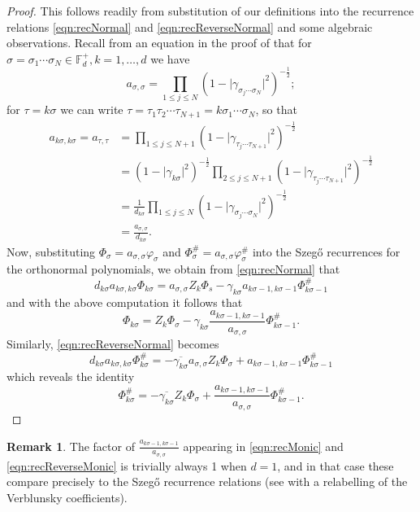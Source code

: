 \documentclass[11pt,reqno]{amsart}
\def\p{\varphi}
\def\g{\gamma}
\def\s{\sigma}
\def\t{\tau}
\def\P{\Phi}
\def\FF{\mathbb{F}}
\theoremstyle{definition}
\newtheorem{remark}[theorem]{Remark}
\numberwithin{equation}{section}
\begin{document}
\begin{proof}
    This follows readily from substitution of our definitions into the recurrence relations \eqref{eqn:recNormal} and \eqref{eqn:recReverseNormal} and some algebraic observations. Recall from an equation in the proof of \cite[Theorem 3.1]{CJ02b} that for \(\s = \s_1\cdots\s_N \in \FF_d^+, k = 1, \ldots, d\) we have
    \[
        a_{\s,\s} = \prod_{1 \leq j \leq N} (1 - \lvert \g_{\s_j \cdots \s_N} \rvert^2)^{-\frac{1}{2}};
    \]
    for \(\t = k\s\) we can write \(\t = \t_1 \t_2 \cdots \t_{N+1} = k \s_1 \cdots \s_N\), so that
    \begin{align*}
        a_{k\s,k\s} = a_{\t,\t} & = \prod_{1 \leq j \leq N+1} (1 - \lvert \g_{\t_j\cdots \t_{N+1}} \rvert^2)^{-\frac{1}{2}}\\
        & = (1 - \lvert \g_{k\s} \rvert^2)^{-\frac{1}{2}} \prod_{2 \leq j \leq N+1} (1 - \lvert \g_{\t_j \cdots \t_{N+1}} \rvert^2)^{-\frac{1}{2}} \\
        & = \frac{1}{d_{k\s}} \prod_{1 \leq j \leq N} (1 - \lvert \g_{\s_j \cdots \s_{N}} \rvert^2)^{-\frac{1}{2}}\\
        & = \frac{a_{\s,\s}}{d_{k\s}}.
    \end{align*}
    Now, substituting \(\P_\s = a_{\s,\s} \p_\s\) and \(\P_\s^{\#} = a_{\s,\s} \p_\s^{\#}\) into the Szeg\H{o} recurrences for the orthonormal polynomials, we obtain from \eqref{eqn:recNormal} that
    \[
        d_{k\s}a_{k\s,k\s} \P_{k\s} = a_{\s,\s} Z_k \P_s - \g_{k\s} a_{k\s-1,k\s-1} \P_{k\s-1}^{\#}
    \]
    and with the above computation it follows that
    \[
        \P_{k\s} = Z_k \P_\s - \g_{k\s}\frac{a_{k\s -1, k\s -1}}{a_{\s,\s}} \P^\#_{k\s - 1}.
    \]
    Similarly, \eqref{eqn:recReverseNormal} becomes
    \[
        d_{k\s} a_{k\s,k\s} \P_{k\s}^{\#} = -\overline{\g_{k\s}} a_{\s,\s} Z_k \P_\s + a_{k\s-1,k\s-1}\P_{k\s-1}^{\#}
    \]
    which reveals the identity
    \[
        \P^\#_{k\s} = -\overline{\g_{k\s}} Z_k \P_\s + \frac{a_{k\s -1, k\s -1}}{a_{\s,\s}}  \P^\#_{k\s - 1}.
    \]
\end{proof}

\begin{remark} 
    The factor of \(\frac{a_{k\s -1, k\s -1}}{a_{\s,\s}}\) appearing in \eqref{eqn:recMonic} and \eqref{eqn:recReverseMonic} is trivially always 1 when \(d = 1\), and in that case these compare precisely to the Szeg\H{o} recurrence relations (see \cite{Sim05} with a relabelling of the Verblunsky coefficients).
\end{remark}
\end{document}
